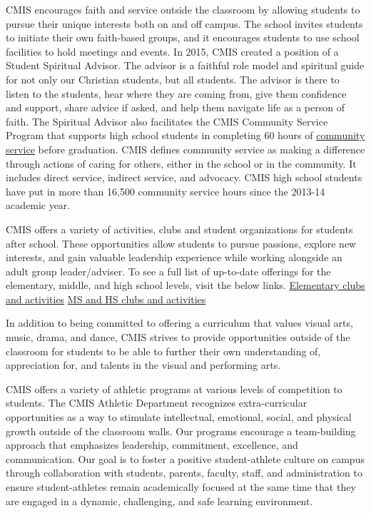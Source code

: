 
CMIS encourages faith and service outside the classroom by allowing students to pursue their unique interests both on and off campus. The school invites students to initiate their own faith-based groups, and it encourages students to use school facilities to hold meetings and events.  In 2015, CMIS created a position of  a Student Spiritual Advisor.  The advisor is a faithful role model and spiritual guide for not only our Christian students, but all students. The advisor is there to listen to the students, hear where they are coming from, give them confidence and support, share advice if asked, and help them navigate life as a person of faith. The Spiritual Advisor also facilitates the CMIS Community Service Program that supports high school students in completing 60 hours of \href{http://cmis.ac.th/programs/community_service}{community service} before graduation. CMIS defines community service as making a difference through actions of caring for others, either in the school or in the community.  It includes direct service, indirect service, and advocacy. CMIS high school students have put in more than 16,500 community service hours since the 2013-14 academic year.


CMIS offers a variety of activities, clubs and student organizations for students after school.  These opportunities allow students to pursue passions, explore new interests, and gain valuable leadership experience while working alongside an adult group leader/adviser.  To see a full list of up-to-date offerings for the elementary, middle, and high school levels, visit the below links.
\href{http://blogs.cmis.ac.th/eagles/clubs-activities/es/}{Elementary clubs and activities}
\href{http://blogs.cmis.ac.th/eagles/clubs-activities/ms-hs/}{MS and HS clubs and activities}


In addition to being committed to offering a curriculum that values visual arts, music, drama, and dance, CMIS strives to provide opportunities outside of the classroom for students to be able to further their own understanding of, appreciation for, and talents in the visual and performing arts.


CMIS offers a variety of athletic programs at various levels of competition to students.  The CMIS Athletic Department recognizes extra-curricular opportunities as a way to stimulate intellectual, emotional, social, and physical growth outside of the classroom walls.  Our programs encourage a team-building approach that emphasizes leadership, commitment, excellence, and communication.  Our goal is to foster a positive student-athlete culture on campus through collaboration with students, parents, faculty, staff, and administration to ensure student-athletes remain academically focused at the same time that they are engaged in a dynamic, challenging, and safe learning environment.

